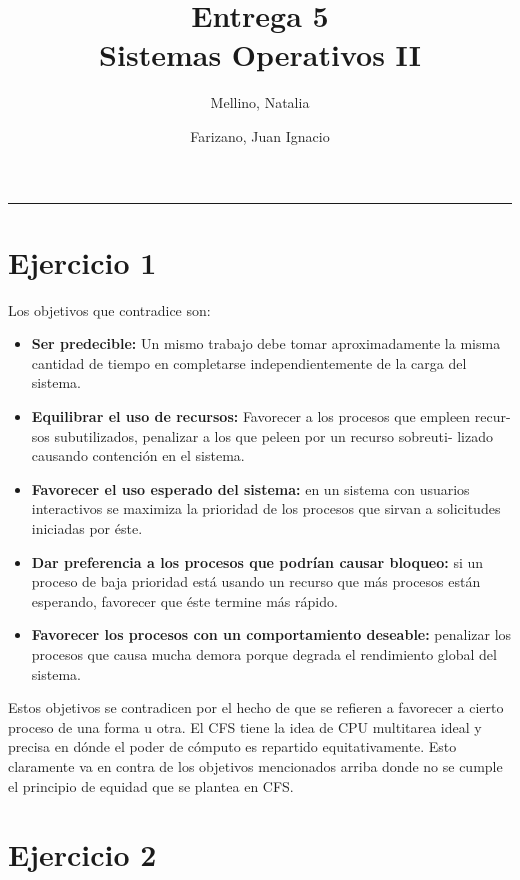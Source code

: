 \documentclass[11pt]{article}
\title{
    Entrega 5 \\
    \large Sistemas Operativos II}
\author{Mellino, Natalia \and Farizano, Juan Ignacio}
\date{}
\begin{document}
\maketitle

\noindent\rule{\textwidth}{1pt}

\section*{Ejercicio 1}

Los objetivos que contradice son:

\begin{itemize} 
    \item \textbf{Ser predecible:} Un mismo trabajo debe tomar aproximadamente la misma
          cantidad de tiempo en completarse independientemente de la carga
          del sistema.

    \item \textbf{Equilibrar el uso de recursos:} Favorecer a los procesos que empleen recur-
           sos subutilizados, penalizar a los que peleen por un recurso sobreuti-
           lizado causando contención en el sistema.

    \item \textbf{Favorecer el uso esperado del sistema:} en un sistema con usuarios interactivos
          se maximiza la prioridad de los procesos que sirvan a solicitudes iniciadas por éste.

    \item \textbf{Dar preferencia a los procesos que podrían causar bloqueo:} si un proceso de 
          baja prioridad está usando un recurso que más procesos están esperando, favorecer
          que éste termine más rápido.

    \item \textbf{Favorecer los procesos con un comportamiento deseable:} penalizar los procesos
          que causa mucha demora porque degrada el rendimiento global del sistema.
\end{itemize}

Estos objetivos se contradicen por el hecho de que se refieren a favorecer a cierto
proceso de una forma u otra. El CFS tiene la idea de CPU multitarea ideal y 
precisa en dónde el poder de cómputo es repartido equitativamente. Esto
claramente va en contra de los objetivos mencionados arriba donde no se cumple
el principio de equidad que se plantea en CFS.

\section*{Ejercicio 2}
\end{document}
